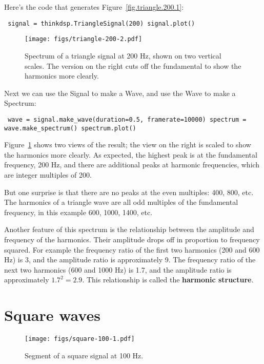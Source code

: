 \documentclass[12pt]{book} \usepackage[width=5.5in,height=8.5in, hmarginratio=3:2,vmarginratio=1:1]{geometry}
\begin{document}
Here's the code that generates Figure~\ref{fig.triangle.200.1}: 

\begin{verbatim} signal = thinkdsp.TriangleSignal(200) signal.plot() \end{verbatim} 

\begin{figure} 

\centerline{\texttt{[image: figs/triangle-200-2.pdf]}} \caption{Spectrum of a triangle signal at 200 Hz, shown on two vertical scales. The version on the right cuts off the fundamental to show the harmonics more clearly.} \label{fig.triangle.200.2} \end{figure} 

Next we can use the Signal to make a Wave, and use the Wave to make a Spectrum: 

\begin{verbatim} wave = signal.make_wave(duration=0.5, framerate=10000) spectrum = wave.make_spectrum() spectrum.plot() \end{verbatim} 

Figure~\ref{fig.triangle.200.2} shows two views of the result; the view on the right is scaled to show the harmonics more clearly. As expected, the highest peak is at the fundamental frequency, 200 Hz, and there are additional peaks at harmonic frequencies, which are integer multiples of 200. 

But one surprise is that there are no peaks at the even multiples: 400, 800, etc. The harmonics of a triangle wave are all odd multiples of the fundamental frequency, in this example 600, 1000, 1400, etc. 

Another feature of this spectrum is the relationship between the amplitude and frequency of the harmonics. Their amplitude drops off in proportion to frequency squared. For example the frequency ratio of the first two harmonics (200 and 600 Hz) is 3, and the amplitude ratio is approximately 9. The frequency ratio of the next two harmonics (600 and 1000 Hz) is 1.7, and the amplitude ratio is approximately $1.7^2 = 2.9$. This relationship is called the {\bf harmonic structure}. 

\section{Square waves} \label{square} 

\begin{figure} 

\centerline{\texttt{[image: figs/square-100-1.pdf]}} \caption{Segment of a square signal at 100 Hz.} \label{fig.square.100.1} \end{figure} 
\end{document}
